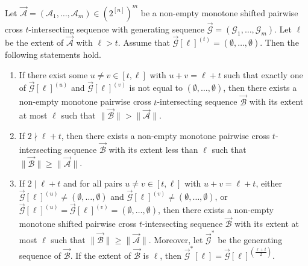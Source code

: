 \documentclass[10pt,a4paper]{amsart}
\begin{document}
\begin{lemma}\label{le22}
  Let $\vec{\mathcal{A}} = (\mathcal{A}_1, \ldots, \mathcal{A}_m) \in (2^{[n]})^{m}$ be  a non-empty monotone shifted pairwise cross $t$-intersecting sequence with  generating sequence  $\vec{\mathcal{G}} = (\mathcal{G}_1, \ldots, \mathcal{G}_m)$. Let $\ell$ be the extent of $\vec{\mathcal{A}}$ with $\ell> t$.
Assume that $\vec{\mathcal{G}}[\ell]^{(t)}=(\emptyset,\ldots,\emptyset)$. Then 
the following statements hold.
\begin{enumerate}
    \item[(1)] If there exist some $u\neq v\in [t,\ell]$ with  $u+v=\ell+t$ such that exactly one of  $\vec{\mathcal{G}}[\ell]^{(u)}$ and $\vec{\mathcal{G}}[\ell]^{(v)}$ is not equal to  $(\emptyset,\ldots, \emptyset)$, then there exists a non-empty monotone pairwise cross $t$-intersecting sequence $\vec{\mathcal{B}}$  with its extent at most $\ell$ such that $\|\vec{\mathcal{B}}\|>\|\vec{\mathcal{A}}\|$.
    
    \item[(2)]  If  $2\nmid \ell+t$, then there exists a non-empty monotone pairwise cross $t$-intersecting sequence $\vec{\mathcal{B}}$  with its extent less than $\ell$  such that $\|\vec{\mathcal{B}}\|\geq \|\vec{\mathcal{A}}\|$.

    
    \item[(3)]   If  $2\mid \ell+t$ and for all pairs $u\neq v\in [t,\ell]$ with  $u+v=\ell+t$,  either $\vec{\mathcal{G}}[\ell]^{(u)}\neq (\emptyset,\ldots, \emptyset)$ and $\vec{\mathcal{G}}[\ell]^{(v)}\neq (\emptyset,\ldots, \emptyset)$, or $\vec{\mathcal{G}}[\ell]^{(u)}=\vec{\mathcal{G}}[\ell]^{(v)}=(\emptyset,\ldots, \emptyset)$, then there exists a non-empty monotone shifted pairwise cross $t$-intersecting sequence $\vec{\mathcal{B}}$  with its extent at most $\ell$  such that $\|\vec{\mathcal{B}}\|\geq \|\vec{\mathcal{A}}\|$. Moreover, let $\vec{\mathcal{G}}^*$ be the generating sequence of $\vec{\mathcal{B}}$.
If the extent of  $\vec{\mathcal{B}}$ is $\ell$, then  $\vec{\mathcal{G}}^*[\ell]= \vec{\mathcal{G}}[\ell]^{(\frac{\ell+t}{2})}$.
\end{enumerate}
\end{lemma}
\end{document}
